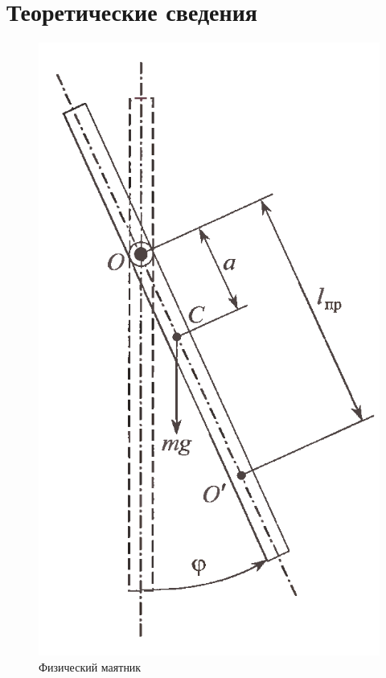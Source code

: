 	\section{Теоретические сведения}
	
	\begin{figure}
		\includegraphics[width=1\linewidth]{ustanovka}
		\caption{Физический маятник}\label{risunok}
	\end{figure}
	
